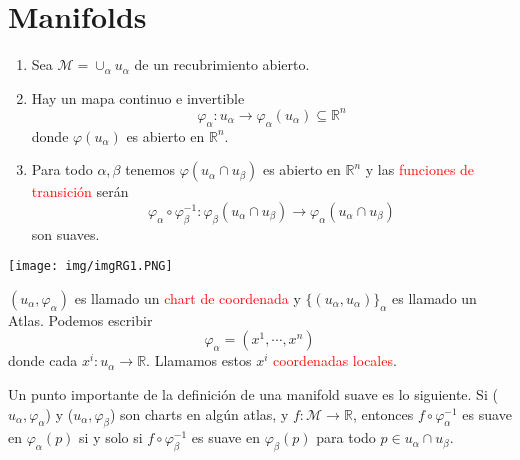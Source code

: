 \documentclass[../main]{subfiles}
\begin{document}
\section{Manifolds}

\begin{enumerate}
    \item Sea $\mathcal{M}=\cup_{\alpha} u_{\alpha}$ de un recubrimiento abierto.
    \item Hay un mapa continuo e invertible
    \begin{equation}
        \varphi_{\alpha}: u_{\alpha} \rightarrow \varphi_{\alpha}(u_{\alpha}) \subseteq \mathbb{R}^n
    \end{equation}
    donde $\varphi(u_{\alpha})$ es abierto en $\mathbb{R}^n$.
    \item Para todo $\alpha, \beta$ tenemos $\varphi(u_{\alpha} \cap u_{\beta})$ es abierto en $\mathbb{R}^n$ y las \textcolor{red}{funciones de transición} serán
    \begin{equation}
        \varphi_{\alpha} \circ \varphi_{\beta}^{-1}: \varphi_{\beta}(u_{\alpha} \cap u_{\beta})\rightarrow \varphi_{\alpha}(u_{\alpha} \cap u_{\beta})
    \end{equation}
    son suaves.
\end{enumerate}

\begin{center}
    \texttt{[image: img/imgRG1.PNG]}
\end{center}
$(u_{\alpha}, \varphi_{\alpha})$ es llamado un \textcolor{red}{chart de coordenada} y $\{(u_{\alpha}, u_{\alpha})\}_{\alpha}$ es llamado un Atlas. Podemos escribir
\begin{equation}
    \varphi_{\alpha}=(x^1, \cdots, x^n)
\end{equation}
donde cada $x^{i}:u_{\alpha}\rightarrow \mathbb{R}$. Llamamos estos $x^{i}$ \textcolor{red}{coordenadas locales}.

Un punto importante de la definición de una manifold suave es lo siguiente. Si ($u_{\alpha}, \varphi_{\alpha}$) y ($u_{\alpha}, \varphi_{\beta}$) son charts en algún atlas, y $f:\mathcal{M}\rightarrow \mathbb{R}$, entonces $f\circ \varphi^{-1}_{\alpha}$ es suave en $\varphi_{\alpha}(p)$ si y solo si $f\circ \varphi^{-1}_{\beta}$ es suave en $\varphi_{\beta}(p)$ para todo $p\in u_{\alpha} \cap u_{\beta}$.
\end{document}
